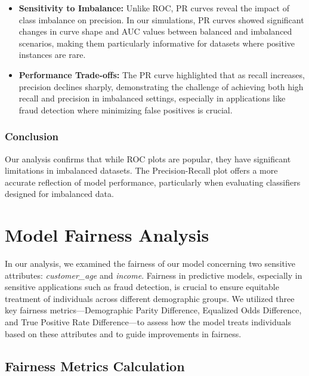 \documentclass[12pt,a4paper]{report}
\begin{document}
\begin{itemize}
    \item \textbf{Sensitivity to Imbalance:} Unlike ROC, PR curves reveal the impact of class imbalance on precision. In our simulations, PR curves showed significant changes in curve shape and AUC values between balanced and imbalanced scenarios, making them particularly informative for datasets where positive instances are rare.
    \item \textbf{Performance Trade-offs:} The PR curve highlighted that as recall increases, precision declines sharply, demonstrating the challenge of achieving both high recall and precision in imbalanced settings, especially in applications like fraud detection where minimizing false positives is crucial.
\end{itemize}


\subsection{Conclusion}

Our analysis confirms that while ROC plots are popular, they have significant limitations in imbalanced datasets. The Precision-Recall plot offers a more accurate reflection of model performance, particularly when evaluating classifiers designed for imbalanced data.\\










\chapter{Model Fairness Analysis}

In our analysis, we examined the fairness of our model concerning two sensitive attributes: \textit{customer\_age} and \textit{income}. Fairness in predictive models, especially in sensitive applications such as fraud detection, is crucial to ensure equitable treatment of individuals across different demographic groups. We utilized three key fairness metrics—Demographic Parity Difference, Equalized Odds Difference, and True Positive Rate Difference—to assess how the model treats individuals based on these attributes and to guide improvements in fairness.\\

\section{Fairness Metrics Calculation}
\end{document}
